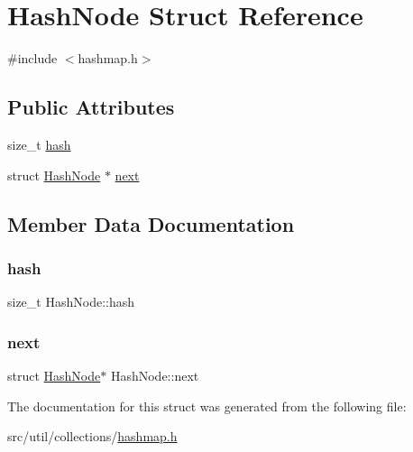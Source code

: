 \hypertarget{structHashNode}{}\section{Hash\+Node Struct Reference}
\label{structHashNode}


{\ttfamily \#include $<$hashmap.\+h$>$}

\subsection*{Public Attributes}
\begin{DoxyCompactItemize}
\item 
size\+\_\+t \hyperlink{structHashNode_a4f6f8039814c656216948c0dd8c0f361}{hash}
\item 
struct \hyperlink{structHashNode}{Hash\+Node} $\ast$ \hyperlink{structHashNode_a3213171b5cdc2bfab119ce74c9971e36}{next}
\end{DoxyCompactItemize}


\subsection{Member Data Documentation}
\hypertarget{structHashNode_a4f6f8039814c656216948c0dd8c0f361}{}\label{structHashNode_a4f6f8039814c656216948c0dd8c0f361} 
\subsubsection{\texorpdfstring{hash}{hash}}
{\footnotesize\ttfamily size\+\_\+t Hash\+Node\+::hash}

\hypertarget{structHashNode_a3213171b5cdc2bfab119ce74c9971e36}{}\label{structHashNode_a3213171b5cdc2bfab119ce74c9971e36} 
\subsubsection{\texorpdfstring{next}{next}}
{\footnotesize\ttfamily struct \hyperlink{structHashNode}{Hash\+Node}$\ast$ Hash\+Node\+::next}



The documentation for this struct was generated from the following file\+:\begin{DoxyCompactItemize}
\item 
src/util/collections/\hyperlink{hashmap_8h}{hashmap.\+h}\end{DoxyCompactItemize}
